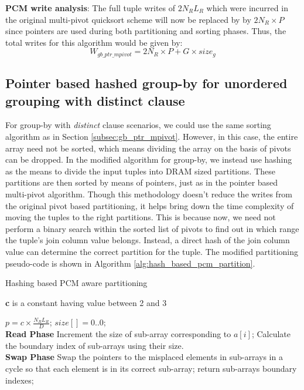 \textbf{PCM write analysis}: The full tuple writes of $2 N_R L_R$ which were incurred in the original multi-pivot quicksort scheme will now be replaced by by $2N_R \times P$ since pointers are used during both partitioning and sorting phases. Thus, the total writes for this algorithm would be given by:
\begin{equation}
\label{eq:gby_ptr_mpivot}
W_{gb\_ptr\_mpivot} = 2N_R \times P + G \times size_g
\end{equation}

\subsection{Pointer based hashed group-by for unordered grouping with distinct clause}

For group-by with \textit{distinct} clause scenarios, we could use the same sorting algorithm as in Section \ref{subsec:gb_ptr_mpivot}. However, in this case, the entire array need not be sorted, which means dividing the array on the basis of pivots can be dropped. In the modified algorithm for group-by, we instead use hashing as the means to divide the input tuples into DRAM sized partitions. These partitions are then sorted by means of pointers, just as in the pointer based multi-pivot algorithm. Though this methodology doesn't reduce the writes from the original pivot based partitioning, it helps bring down the time complexity of moving the tuples to the right partitions. This is because now, we need not perform a binary search within the sorted list of pivots to find out in which range the tuple's join column value belongs. Instead, a direct hash of the join column value can determine the correct partition for the tuple. The modified partitioning pseudo-code is shown in Algorithm \ref{alg:hash_based_pcm_partition}.

\begin{algorithm}[h!]
\caption{Hashing based PCM aware partitioning}
\label{alg:hash_based_pcm_partition}
\textbf{c} is a constant having value between 2 and 3\\
\begin{algorithmic}[1]
\State $ p = c\times \frac{N_R L_R}{D}$;
\State $ size[] = {0..0}$;   
\\
\textbf{Read Phase}
\State Increment the size of sub-array corresponding to $a[i]$; 
\EndFor
{}
\State Calculate the boundary index of sub-arrays using their size.\\
\textbf{Swap Phase}
\State Swap the pointers to the misplaced elements in sub-arrays in a cycle so that each element is in its correct sub-array;
\State return sub-arrays boundary indexes;
\end{algorithmic}
\end{algorithm} 


